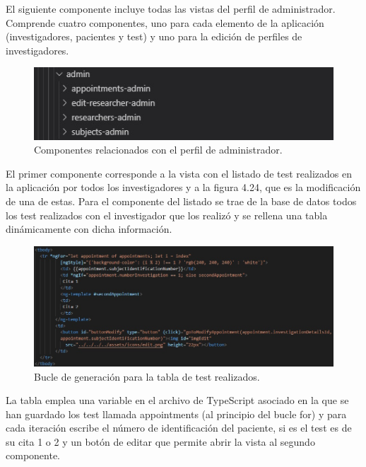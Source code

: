     El siguiente componente incluye todas las vistas del perfil de administrador. Comprende cuatro componentes, uno para cada elemento de la aplicación (investigadores, pacientes y test) y uno para la edición de perfiles de investigadores.
    
    \begin{figure}[h]
    \centering
    \includegraphics[width=1\textwidth]{images/adminComponents.jpg}
    \caption{Componentes relacionados con el perfil de administrador.}
    \end{figure}
    \FloatBarrier
    
    El primer componente corresponde a la vista con el listado de test realizados en la aplicación por todos los investigadores y a la figura 4.24, que es la modificación de una de estas. Para el componente del listado se trae de la base de datos todos los test realizados con el investigador que los realizó y se rellena una tabla dinámicamente con dicha información.
    
    \begin{figure}[h]
    \centering
    \includegraphics[width=1\textwidth]{images/appointmentTable.jpg}
    \caption{Bucle de generación para la tabla de test realizados.}
    \end{figure}
    \FloatBarrier
    
    La tabla emplea una variable en el archivo de TypeScript asociado en la que se han guardado los test llamada appointments (al principio del bucle for) y para cada iteración escribe el número de identificación del paciente, si es el test es de su cita 1 o 2 y un botón de editar que permite abrir la vista al segundo componente.\newline
    
